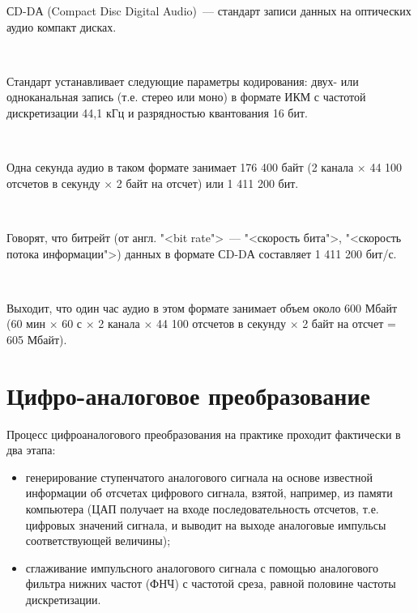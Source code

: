 \documentclass{beamer}
\begin{document}
\begin{frame}
СD-DА (Compact Disc Digital Audio)~--- стандарт записи данных на оптических аудио компакт дисках. 

~

Стандарт устанавливает следующие параметры кодирования: двух- или одноканальная запись (т.е. стерео или моно) в формате ИКМ с частотой дискретизации 44,1 кГц и разрядностью квантования 16 бит. 

~

Одна секунда аудио в таком формате занимает 176 400 байт (2 канала $\times$ 44 100 отсчетов в секунду $\times$ 2 байт на отсчет) или 1 411 200 бит. 

~

Говорят, что битрейт (от англ. "<bit rate">~--- "<скорость бита">, "<скорость потока информации">) данных в формате СD-DА составляет 1 411 200 бит/с. 

~

Выходит, что один час аудио в этом формате занимает объем около 600 Мбайт (60 мин $\times$ 60 с $\times$ 2 канала $\times$ 44 100 отсчетов в секунду $\times$ 2 байт на отсчет = 605 Мбайт).
\end{frame}

\section{Цифро-аналоговое преобразование}
\begin{frame}
Процесс цифроаналогового преобразования на практике проходит фактически в два этапа:
\begin{itemize}
\item генерирование ступенчатого аналогового сигнала на основе известной информации об отсчетах цифрового сигнала, взятой, например, из памяти компьютера (ЦАП получает на входе последовательность отсчетов, т.е. цифровых значений сигнала, и выводит на выходе аналоговые импульсы соответствующей величины);
\item сглаживание импульсного аналогового сигнала с помощью аналогового фильтра нижних частот (ФНЧ) с частотой среза, равной половине частоты дискретизации.
\end{itemize}
\end{frame}
\end{document}
